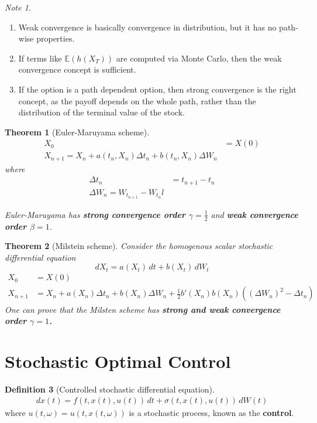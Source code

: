 \documentclass[10pt, oneside, reqno]{amsart}
\theoremstyle{plain}%
\newtheorem{thm}{Theorem}[section]
\numberwithin{equation}{section}
\theoremstyle{definition}
\newtheorem{defn}[thm]{Definition}
\theoremstyle{remark}
\newtheorem*{note}{Note}
\newcommand{\E}{\mathbb{E}}
\begin{document}
\begin{note}
	\begin{enumerate}
		\item Weak convergence is basically convergence in distribution, but it has no path-wise properties.
		\item If terms like $\E(h(X_T))$ are computed via Monte Carlo, then the weak convergence concept is sufficient.  
		\item If the option is a path dependent option, then strong convergence is the right concept, as the payoff depends on the whole path, rather than the distribution of the terminal value of the stock.  
	\end{enumerate}
\end{note}

\begin{thm}[Euler-Maruyama scheme]
	\begin{align*}
		X_0 &= X(0) \\
		X_{n+1} = X_{n} + a(t_n, X_n) \Delta t_n + b(t_n, X_n) \Delta W_n
	\end{align*} where \begin{align*}
		\Delta t_n &= t_{n+1} - t_n \\
		\Delta W_n = W_{t_{n+1}} - W_{t_n}l
	\end{align*}
	
	Euler-Maruyama has \textbf{strong convergence order $\gamma = \frac{1}{2}$} and \textbf{weak convergence order $\beta = 1$}.
\end{thm}

\begin{thm}[Milstein scheme]
	Consider the homogenous scalar stochastic differential equation \[
		dX_t = a(X_t) \, dt + b(X_t) \, dW_t
	\]  
	\begin{align*}
		X_0 &= X(0) \\
		X_{n+1} &= X_n + a(X_n) \Delta t_n + b(X_n) \Delta W_n + \frac{1}{2} b'(X_n)b(X_n)((\Delta W_n)^2 - \Delta t_n)
	\end{align*}   
	One can prove that the Milsten scheme has \textbf{strong and weak convergence order $\gamma = 1$.}
\end{thm}
\section{Stochastic Optimal Control} %
\label{sec:stochastic_optimal_control}

\begin{defn}[Controlled stochastic differential equation]
	\begin{align*}
		dx(t) = f(t, x(t), u(t)) \, dt + \sigma(t,x(t), u(t)) \, dW(t)
	\end{align*} where $u(t, \omega) = u(t, x(t, \omega))$ is a stochastic process, known as the \textbf{control}.  
\end{defn}
\end{document}
